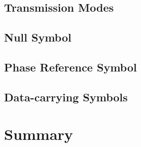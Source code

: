 \documentclass[class=report,11pt,crop=false]{standalone}
\begin{document}
\subsection{Transmission Modes}

\subsection{Null Symbol \label{subsect:dab-std_null}}


\subsection{Phase Reference Symbol \label{subsect:dab-std_prs}}


\subsection{Data-carrying Symbols \label{subsect:dab-std_data}}

\section{Summary}


\ifstandalone

\printnoidxglossary[type=\acronymtype, nonumberlist]
\fi
\end{document}
